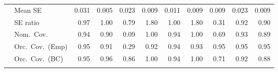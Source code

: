 \begin{landscape}
\begin{longtable}{llrrrrrrrrr}
 & Mean SE & 0.031 & 0.005 & 0.023 & 0.009 & 0.011 & 0.009 & 0.009 & 0.023 & 0.009 \\
 & SE ratio & \cellcolor{ranktwo}0.97 & \cellcolor{rankone}1.00 & 0.79 & 1.80 & \cellcolor{rankone}1.00 & 1.80 & 0.31 & \cellcolor{rankthree}0.92 & 0.90 \\
 & Nom.\ Cov. & \cellcolor{rankone}0.94 & \cellcolor{rankthree}0.90 & 0.09 & \cellcolor{rankthree}1.00 & \cellcolor{rankone}0.94 & \cellcolor{rankthree}1.00 & 0.69 & \cellcolor{ranktwo}0.93 & 0.89 \\
 & Orc.\ Cov.\ (Emp) & \cellcolor{rankone}0.95 & 0.91 & 0.29 & 0.92 & \cellcolor{ranktwo}0.94 & \cellcolor{rankthree}0.93 & \cellcolor{rankone}0.95 & \cellcolor{rankone}0.95 & \cellcolor{rankone}0.95 \\
 & Orc.\ Cov.\ (BC) & \cellcolor{rankone}0.95 & \cellcolor{ranktwo}0.96 & 0.86 & 1.00 & \cellcolor{ranktwo}0.94 & 1.00 & 0.71 & \cellcolor{rankthree}0.92 & 0.88 \\
\addlinespace[2pt]
\end{longtable}
\end{landscape}
